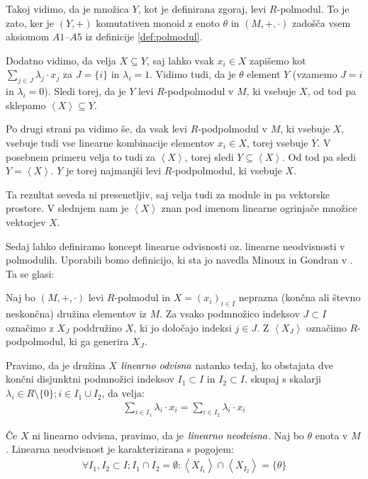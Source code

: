 \documentclass[mat1]{fmfdelo}
\newcommand{\pojem}[1]{\ensuremath{\emph{#1}}}
\newcommand{\Gen}[1]{\ensuremath{\left<{#1}\right>}}
\begin{document}
\begin{dokaz}
	
	Takoj vidimo, da je množica $Y$, kot je definirana zgoraj, levi $R$-polmodul. To je zato, ker je $(Y, +)$ komutativen monoid z enoto $\theta$ in $(M, +, \cdot)$ zadošča vsem aksiomom $A1$--$A5$ iz definicije \ref{def:polmodul}.
	
	Dodatno vidimo, da velja $X \subseteq Y$, saj lahko vsak $x_i\in X$ zapišemo kot $\sum_{j\in J}\lambda_j\cdot x_j$ za $J = \{i\}$ in $\lambda_i = 1$. Vidimo tudi, da je $\theta$ element $Y$ (vzamemo $J = {i}$ in $\lambda_i = 0$). Sledi torej, da je $Y$ levi $R$-podpolmodul v $M$, ki vsebuje $X$, od tod pa sklepamo $\Gen{X} \subseteq Y$. 
	
	Po drugi strani pa vidimo še, da vsak levi $R$-podpolmodul v $M$, ki vsebuje $X$, vsebuje tudi vse linearne kombinacije elementov $x_i\in X$, torej vsebuje $Y$. V posebnem primeru velja to tudi za \Gen{X}, torej sledi $Y \subseteq \Gen{X}$. Od tod pa sledi $Y = \Gen{X}$. $Y$ je torej najmanjši levi $R$-podpolmodul, ki vsebuje $X$.
\end{dokaz}

Ta rezultat seveda ni presenetljiv, saj velja tudi za module in pa vektorske prostore. V slednjem nam je \Gen{X} znan pod imenom linearne ogrinjače množice vektorjev $X$.

Sedaj lahko definiramo koncept linearne odvisnosti oz. linearne neodvisnosti v polmodulih. Uporabili bomo definicijo, ki sta jo navedla Minoux in Gondran v \cite[2.\,5.\,1.\,]{bib:Gondran}. Ta se glasi:

\begin{definicija}
	Naj bo $(M, +, \cdot)$ levi $R$-polmodul in $X = (x_i)_{i \in I}$ neprazna (končna ali števno neskončna) družina elementov iz $M$. Za vsako podmnožico indeksov $J \subset I$ označimo z $X_J$ poddružino $X$, ki jo določajo indeksi $j\in J$. Z $\Gen{X_J}$ označimo $R$-podpolmodul, ki ga generira $X_J$.
	
	Pravimo, da je družina $X$ \pojem{linearno odvisna} natanko tedaj, ko obstajata dve končni disjunktni podmnožici indeksov $I_1\subset I$ in $I_2\subset I$, skupaj s skalarji $\lambda_i \in R\setminus\{0\}; i\in I_1\cup I_2$, da velja: \begin{align*}
		\sum_{i \in I_1}\lambda_i\cdot x_i = \sum_{i \in I_2}\lambda_i\cdot x_i 
	\end{align*}

	Če $X$ ni linearno odvisna, pravimo, da je \pojem{linearno neodvisna}. Naj bo $\theta$ enota v $M$. Linearna neodvisnost je karakterizirana s pogojem: \begin{align}
		\forall I_1, I_2 \subset I; I_1\cap I_2 =\emptyset: \Gen{X_{I_1}}\cap\Gen{X_{I_2}} = \{\theta\}
	\end{align}
\end{definicija}
\end{document}
